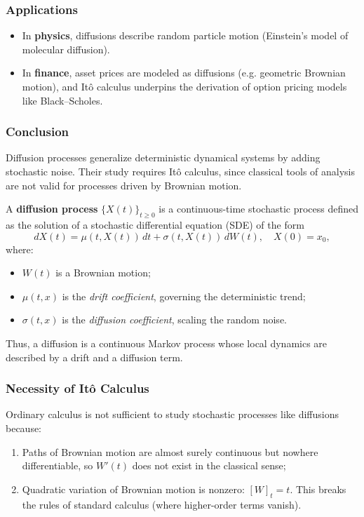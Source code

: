 \documentclass[12pt,a4paper]{book}
\theoremstyle{remark}
\begin{document}
\subsubsection*{Applications}
\begin{itemize}
    \item In \textbf{physics}, diffusions describe random particle motion (Einstein’s model of molecular diffusion).
    \item In \textbf{finance}, asset prices are modeled as diffusions (e.g. geometric Brownian motion), and Itô calculus underpins the derivation of option pricing models like Black–Scholes.
\end{itemize}

\subsubsection*{Conclusion}
Diffusion processes generalize deterministic dynamical systems by adding stochastic noise. Their study requires Itô calculus, since classical tools of analysis are not valid for processes driven by Brownian motion.

A \textbf{diffusion process} $\{X(t)\}_{t\ge 0}$ is a continuous-time stochastic process defined as the solution of a stochastic differential equation (SDE) of the form
\[
dX(t) = \mu(t,X(t))\,dt + \sigma(t,X(t))\,dW(t), \quad X(0)=x_0,
\]
where:
\begin{itemize}
    \item $W(t)$ is a Brownian motion;
    \item $\mu(t,x)$ is the \emph{drift coefficient}, governing the deterministic trend;
    \item $\sigma(t,x)$ is the \emph{diffusion coefficient}, scaling the random noise.
\end{itemize}
Thus, a diffusion is a continuous Markov process whose local dynamics are described by a drift and a diffusion term.

\subsubsection*{Necessity of Itô Calculus}
Ordinary calculus is not sufficient to study stochastic processes like diffusions because:
\begin{enumerate}[label=\roman*)]
    \item Paths of Brownian motion are almost surely continuous but nowhere differentiable, so $W'(t)$ does not exist in the classical sense;
    \item Quadratic variation of Brownian motion is nonzero: $[W]_t = t$. This breaks the rules of standard calculus (where higher-order terms vanish).
\end{enumerate}
\end{document}

